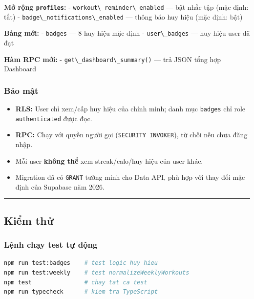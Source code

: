 \documentclass[12pt,a4paper]{article}
\providecommand{\passthrough}[1]{#1}
\providecommand{\tightlist}{%
  \setlength{\itemsep}{0pt}\setlength{\parskip}{0pt}}
\begin{document}
\textbf{Mở rộng \passthrough{\lstinline!profiles!}:} -
\passthrough{\lstinline!workout\_reminder\_enabled!} --- bật nhắc tập
(mặc định: tắt) -
\passthrough{\lstinline!badge\_notifications\_enabled!} --- thông báo
huy hiệu (mặc định: bật)

\textbf{Bảng mới:} - \passthrough{\lstinline!badges!} --- 8 huy hiệu mặc
định - \passthrough{\lstinline!user\_badges!} --- huy hiệu user đã đạt

\textbf{Hàm RPC mới:} -
\passthrough{\lstinline!get\_dashboard\_summary()!} --- trả JSON tổng
hợp Dashboard

\subsubsection{Bảo mật}\label{bux1ea3o-mux1eadt}

\begin{itemize}
\tightlist
\item
  \textbf{RLS:} User chỉ xem/cấp huy hiệu của chính mình; danh mục
  \passthrough{\lstinline!badges!} chỉ role
  \passthrough{\lstinline!authenticated!} được đọc.
\item
  \textbf{RPC:} Chạy với quyền người gọi
  (\passthrough{\lstinline!SECURITY INVOKER!}), từ chối nếu chưa đăng
  nhập.
\item
  Mỗi user \textbf{không thể} xem streak/calo/huy hiệu của user khác.
\item
  Migration đã có \passthrough{\lstinline!GRANT!} tường minh cho Data
  API, phù hợp với thay đổi mặc định của Supabase năm 2026.
\end{itemize}

\begin{center}\rule{0.5\linewidth}{0.5pt}\end{center}

\subsection{Kiểm thử}\label{kiux1ec3m-thux1eed}

\subsubsection{Lệnh chạy test tự
động}\label{lux1ec7nh-chux1ea1y-test-tux1ef1-ux111ux1ed9ng}

\begin{lstlisting}[language=bash]
npm run test:badges    # test logic huy hieu
npm run test:weekly    # test normalizeWeeklyWorkouts
npm test               # chay tat ca test
npm run typecheck      # kiem tra TypeScript

\end{lstlisting}
\end{document}
